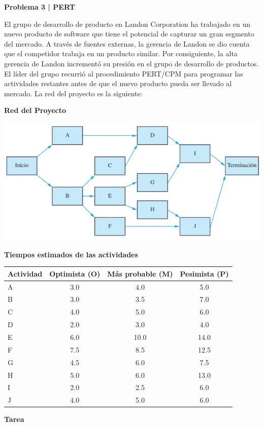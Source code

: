 \documentclass{article}
\begin{document}
\newpage
\begin{problem}
\textbf{Problema 3 | PERT}

El grupo de desarrollo de producto en Landon Corporation ha trabajado en un nuevo producto de software que tiene el potencial de capturar un gran segmento del mercado. A través de fuentes externas, la gerencia de Landon se dio cuenta que el competidor trabaja en un producto similar. Por consiguiente, la alta gerencia de Landon incrementó su presión en el grupo de desarrollo de productos. El líder del grupo recurrió al procedimiento PERT/CPM para programar las actividades restantes antes de que el nuevo producto pueda ser llevado al mercado. La red del proyecto es la siguiente:

\textbf{Red del Proyecto}

\begin{center}
\includegraphics[scale=0.5]{images/10-problema2.png}
\end{center}

\textbf{Tiempos estimados de las actividades}
\begin{center}
\begin{tabular}{|l|c|c|c|}
\hline
\textbf{Actividad} & \textbf{Optimista (O)} & \textbf{Más probable (M)} & \textbf{Pesimista (P)} \\
\hline
A & 3.0 & 4.0 & 5.0 \\
B & 3.0 & 3.5 & 7.0 \\
C & 4.0 & 5.0 & 6.0 \\
D & 2.0 & 3.0 & 4.0 \\
E & 6.0 & 10.0 & 14.0 \\
F & 7.5 & 8.5 & 12.5 \\
G & 4.5 & 6.0 & 7.5 \\
H & 5.0 & 6.0 & 13.0 \\
I & 2.0 & 2.5 & 6.0 \\
J & 4.0 & 5.0 & 6.0 \\
\hline
\end{tabular}
\end{center}
\textbf{Tarea}


\end{problem}
\end{document}
